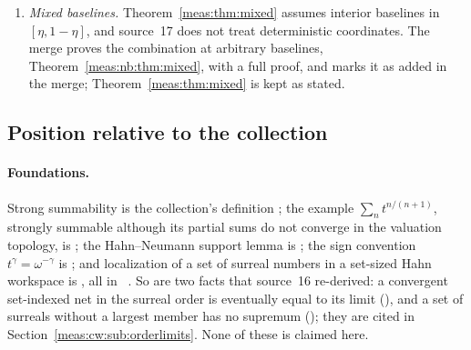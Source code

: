 \documentclass[11pt]{article}
\numberwithin{equation}{section}
\theoremstyle{definition}
\theoremstyle{remark}
\begin{document}
\begin{enumerate}[label=(\arabic*)]
variation bound is the necessity half of Theorem~\ref{meas:thm:extension}; its
positivity from domination is Corollary~\ref{meas:cor:dominated}. Its re-derivations
of Theorem~\ref{meas:thm:interior}, Proposition~\ref{meas:prop:general-l1} and the
interior case of Corollary~\ref{meas:cor:iid} are recorded as consequences
(Section~\ref{meas:nb:sub:relation}); the earlier statements and proofs are kept,
since they give more in their settings (the $L^2$ chaos bounds of
Section~\ref{meas:sec:interior}) or cover cases source~17 excludes
($q\in\{0,1\}$ in Corollary~\ref{meas:cor:iid}). The necessity proofs are genuinely
different at the first-order step (the fourth-power bound of
Lemma~\ref{meas:lem:L1lower} against symmetrization), and both are kept. Its
direct strong-additivity obstruction is kept as a second route to what
Corollary~\ref{meas:cor:coefficient-test} gives (Proposition~\ref{meas:nb:prop:notstrong}).
\item \emph{Mixed baselines.} Theorem~\ref{meas:thm:mixed} assumes interior
baselines in $[\eta,1-\eta]$, and source~17 does not treat deterministic
coordinates. The merge proves the combination at arbitrary baselines,
Theorem~\ref{meas:nb:thm:mixed}, with a full proof, and marks it as added in the
merge; Theorem~\ref{meas:thm:mixed} is kept as stated.
\end{enumerate}

\subsection{Position relative to the collection}\label{meas:sub:collection}

\paragraph{Foundations.} Strong summability is the collection's definition
; the example $\sum_nt^{n/(n+1)}$, strongly
summable although its partial sums do not converge in the valuation
topology, is ; the Hahn--Neumann support lemma
is ; the sign convention
$t^\gamma=\omega^{-\gamma}$ is ; and localization of a
set of surreal numbers in a set-sized Hahn workspace is
, all in ~\cite{repofound}.
So are two facts that source~16 re-derived: a convergent set-indexed net in
the surreal order is eventually equal to its limit (),
and a set of surreals without a largest member has no supremum
(); they are cited in
Section~\ref{meas:cw:sub:orderlimits}. None of these is claimed here.
\end{document}
